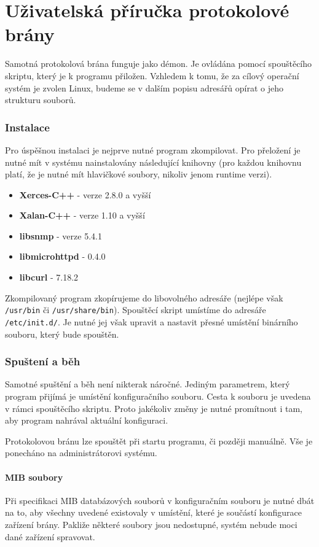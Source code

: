 \chapter{Uživatelská příručka protokolové brány}
\label{kap_uzivatelska_prirucka_brana}
Samotná protokolová brána funguje jako démon. Je ovládána pomocí spouštěcího skriptu, který je k
programu přiložen. Vzhledem k tomu, že za cílový operační systém je zvolen Linux, budeme se v dalším 
popisu adresářů opírat o jeho strukturu souborů.

\subsection*{Instalace}
Pro úspěšnou instalaci je nejprve nutné program zkompilovat. Pro přeložení je nutné mít v systému nainstalovány následující knihovny
(pro každou knihovnu platí, že je nutné mít hlavičkové soubory, nikoliv jenom runtime verzi).
\begin{itemize}
	\item \textbf{Xerces-C++} - verze 2.8.0 a vyšší
	\item \textbf{Xalan-C++} - verze 1.10 a vyšší
	\item \textbf{libsnmp} - verze 5.4.1
	\item \textbf{libmicrohttpd} - 0.4.0
	\item \textbf{libcurl} - 7.18.2
\end{itemize}

Zkompilovaný program zkopírujeme do libovolného adresáře (nejlépe však \verb|/usr/bin| či \verb|/usr/share/bin|). 
Spouštěcí skript umístíme do adresáře \verb|/etc/init.d/|. Je nutné jej však upravit a nastavit přesné umístění
binárního souboru, který bude spouštěn.

\subsection*{Spuštení a běh}
Samotné spuštění a běh není nikterak náročné. Jediným parametrem, který program přijímá je umístění konfiguračního souboru.
Cesta k souboru je uvedena v rámci spouštěcího skriptu. Proto jakékoliv změny je nutné promítnout i tam, aby program nahrával
aktuální konfiguraci.

Protokolovou bránu lze spouštět při startu programu, či později manuálně. Vše je ponecháno na administrátorovi systému.

\subsubsection*{MIB soubory}
Při specifikaci MIB databázových souborů v konfiguračním souboru je nutné dbát na to, aby všechny uvedené existovaly
v umístění, které je součástí konfigurace zařízení brány. Pakliže některé soubory jsou nedostupné, systém nebude moci
dané zařízení spravovat.




